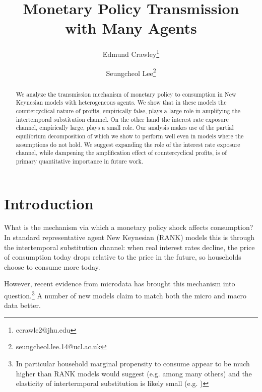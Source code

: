 \documentclass[12pt,a4paper]{article}
\title{Monetary Policy Transmission \\ with Many Agents}
\author[1]{Edmund Crawley\thanks{ecrawle2@jhu.edu}}
\author[2]{Seungcheol Lee\thanks{seungcheol.lee.14@ucl.ac.uk}}
\affil[1]{Department of Economics, Johns Hopkins University,}
\affil[2]{Department of Economics, University College London}
\begin{document}
\begin{titlingpage}
    \maketitle
    \begin{abstract}
We analyze the transmission mechanism of monetary policy to consumption in New Keynesian models with heterogeneous agents. We show that in these models the countercyclical nature of profits, empirically false, plays a large role in amplifying the intertemporal substitution channel. On the other hand the interest rate exposure channel, empirically large, plays a small role. Our analysis makes use of the partial equilibrium decomposition of \cite{auclert_monetary_2017} which we show to perform well even in models where the assumptions do not hold. We suggest expanding the role of the interest rate exposure channel, while dampening the amplification effect of countercyclical profits, is of primary quantitative importance in future work.
    \end{abstract}
\end{titlingpage}

\section{Introduction}
What is the mechanism via which a monetary policy shock affects consumption? In standard representative agent New Keynesian (RANK) models this is through the intertemporal substitution channel: when real interest rates decline, the price of consumption today drops relative to the price in the future, so households choose to consume more today.

However, recent evidence from microdata has brought this mechanism into question.\footnote{In particular household marginal propensity to consume appear to be much higher than RANK models would suggest (e.g. \cite{parker_consumer_2013} among many others) and the elasticity of intertermporal substitution is likely small (e.g. \cite{best_estimating_2018})} A number of new models claim to match both the micro and macro data better.
\end{document}
